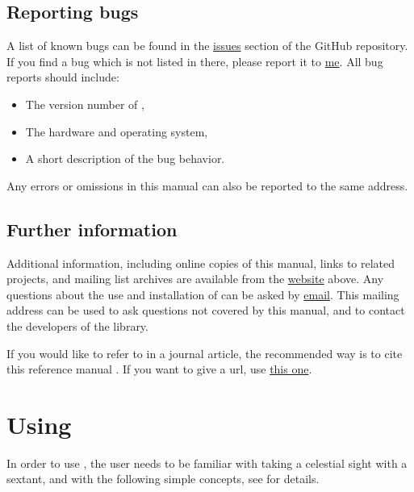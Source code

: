 \documentclass{ol-softwaremanual}
\begin{document}
\subsection{Reporting bugs}

A list of known bugs can be found in the \href{https://github.com/mcastel1/thelemacus/issues}{issues} section of the GitHub repository.
If you find a bug which is not listed in there, please report it to \href{mailto:michele.castellana@gmail.com}{me}. All bug reports should include:
\begin{itemize}
    \item The version number of \thel, 
    \item The hardware and operating system, 
    \item A short description of the bug behavior. 

\end{itemize}

Any errors or omissions in this manual can also be reported to the same address.


\subsection{Further information}


Additional information, including online copies of this manual, links to related projects, and mailing list archives are available from the \href{https://sites.google.com/site/michelecastellana/home}{website}  above.
Any questions about the use and installation of \thel can be asked by \href{mailto:michele.castellana@gmail.com}{email}. This mailing address can be used to ask questions not covered by this manual, and to contact the developers of the library.

If you would like to refer to \thel in a journal article, the recommended way is to cite this reference manual \cite{castellana2024thelemacus-documentation}. If you want to give a url, use  \href{https://sites.google.com/site/michelecastellana/home}{this one}. 


\pagebreak

\section{Using \thel}

In order to use \thel, the user needs to be familiar with taking a celestial sight with a sextant, and with the following simple concepts, see \cite{bowditch2002the} for details. 
\end{document}
